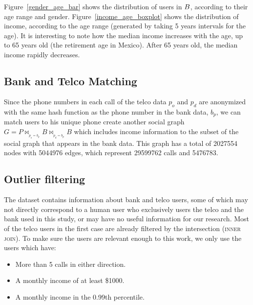 Figure~\ref{gender_age_bar} shows the distribution of users in $\mathlarger{B}$, according to
their age range and gender.
Figure~\ref{income_age_boxplot} shows the distribution of income, according to the age range (generated by taking 5 years intervals for the age).
It is interesting to note how the median income increases with the age, up to 65 years old (the retirement age in Mexico). After 65 years old, the median income rapidly decreases.


\subsection{Bank and Telco Matching}

Since the phone numbers in each call of the telco data $ p_o $ and $ p_d $ are anonymized with the same hash function as the phone number in the bank data, $ b_p $, we can match users to his unique phone create another social graph $ G = P \bowtie_{_{p_o = b_p}} B \bowtie_{_{p_d = b_p}} B $ which includes income information to the subset of the social graph that appears in the bank data.
This graph has a total of \num{2027554} nodes with \num{5044976} edges, which represent \num{29599762} calls and \num{5476783}.

\subsection{Outlier filtering}

The dataset contains information about bank and telco users, some of which may not directly correspond to a human user who exclusively users the telco and the bank used in this study, or may have no useful information for our research. Most of the telco users in the first case are already filtered by the intersection (\textsc{inner join}). To make sure the users are relevant enough to this work, we only use the users which have:

\begin{itemize}
	\item More than 5 calls in either direction.
	\item A monthly income of at least \$\num{1000}.
	\item A monthly income in the \num{0.99}th percentile.
\end{itemize}
